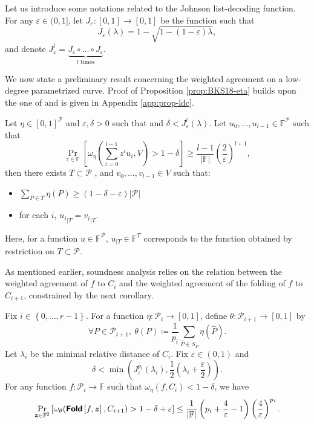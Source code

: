 \documentclass[a4paper,USenglish,autoref]{lipics-v2021}
\renewcommand\epsilon{\varepsilon}
\renewcommand\hat{\widehat}
\newcommand\F{\mathbb{F}}
\newcommand\fold[1]{\textsf{\textbf{Fold}}\left[#1\right]}
\renewcommand{\hat}{\widehat}
\def\rest#1#2{{{#1}_{|#2}}}
\renewcommand{\vec}[1]{\boldsymbol{#1}}
\newcommand{\set}[1]{\left\{#1\right\}}
\newcommand{\size}[1]{\left|#1\right|}
\newcommand{\range}[1]{\set{0,\dots,#1-1}}
\newcommand\bfz{{\vec{z}}}
\newcommand\calP{\mathcal{P}}
\newcommand\mydef{\coloneqq}
\begin{document}
Let us introduce some notations related to the Johnson list-decoding function. For any $\epsilon \in (0,1]$, let $J_\epsilon : [0,1] \rightarrow [0,1]$ be the function such that \[J_\epsilon(\lambda) = 1 - \sqrt{1 - (1 - \epsilon)\lambda},\] and denote $J_{\epsilon}^{l} = \underbrace{J_\epsilon \circ \dots \circ J_\epsilon}_{\text{$l$ times}}$.

We now state a preliminary result concerning the weighted agreement on a low-degree parametrized curve. Proof of Proposition \ref{prop:BKS18-eta} builds upon the one of \cite[Theorem~4.5]{BKS18} and is given in Appendix \ref{app:prop-ldc}.

\begin{proposition}\label{prop:BKS18-eta}
	Let $\eta \in [0,1]^\calP$ and $\epsilon,\delta>0$ such that and $\delta < J_{\epsilon}^l(\lambda)$.
	Let ${u_0, \ldots, u_{l-1} \in \F^\calP}$ such that
	\begin{equation}\label{eq:pr-randcombi-weighted}
		\Pr_{z \in \F }\left[\omega_\eta\left(\sum_{i = 0}^{l - 1} z^i u_i, V\right)>1-\delta \right]\geq \frac{l-1}{|\F|}\left(\frac{2}{\epsilon}\right)^{l+1},
	\end{equation}
	then there exists $T \subset \calP$ , and $v_0, \ldots, v_{l-1} \in V$ such that:
	\begin{itemize}
		\item $\sum_{P\in T} \eta(P) \ge (1 - \delta - \epsilon)|\calP|$
		\item for each $i$, $\rest{u_i}{T} = \rest{v_i}{T}$.
	\end{itemize}
\end{proposition}

Here, for a function $u \in \F^\calP$, $\rest{u}{T} \in \F^T$ corresponds to the function obtained by restriction on $T \subset \calP$.

As mentioned earlier, soundness analysis relies on the relation between the weighted agreement of $f$ to $C_i$ and the weighted agreement of the folding of $f$ to $C_{i+1}$, constrained by the next corollary.

\begin{corollary}\label{coro:pre-soundness}
	Fix $i \in \range{r}$. For a function $\eta : \calP_i \rightarrow [0,1]$, define ${\theta : \calP_{i+1} \rightarrow [0,1]}$ by
	\[\forall P \in \calP_{i+1}, \: \theta(P)\mydef\frac{1}{p_i} \sum_{\hat{P} \in S_P} \eta(\hat{P}).\] 
	Let $\lambda_i$ be the minimal relative distance of $C_i$. Fix $\epsilon \in (0,1)$ and \[\delta < \min\left(J_{\epsilon}^{p_i}(\lambda_i), \frac{1}{2}\left( \lambda_i + \frac{\epsilon}{2} \right) \right).\] For any function $f : \calP_i \rightarrow \F$ such that $\omega_\eta(f, C_i) < 1-\delta$, we have
	\[
	\Pr_{\bfz \in \F^2}\left[\omega_\theta(\fold{f, \bfz}, C_{i+1}) > 1 - \delta + \epsilon\right] \leq 
	\frac{1}{\size \F}\left(p_i + \frac{4}{\epsilon} - 1\right)\left(\frac{4}{\epsilon}\right)^{p_i}.
	\]
\end{corollary}
\end{document}
